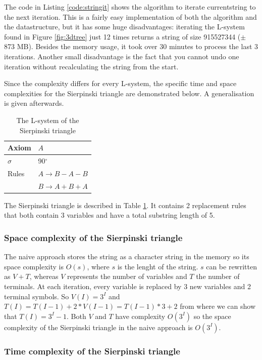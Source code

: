 \documentclass[11pt,a4paper]{article}
\newcommand{\degree}{\ensuremath{^\circ}}
\begin{document}
The code in Listing \ref{code:stringit} shows the algorithm to iterate currentstring to the next iteration. This is a fairly easy implementation of both the algorithm and the datastructure, but it has some huge disadvantages: iterating the L-system found in Figure \ref{fig:3dtree} just 12 times returns a string of size 915527344 ($\pm$ 873 MB). Besides the memory usage, it took over 30 minutes to process the last 3 iterations. Another small disadvantage is the fact that you cannot undo one iteration without recalculating the string from the start.

Since the complexity differs for every L-system, the specific time and space complexities for the Sierpinski triangle are demonstrated below. A generalisation is given afterwards.

\begin{table}
\center
\begin{tabular}{l l}
Axiom & $A$ \\ \hline
$\sigma$ & 90\degree \\ \hline
Rules & $A \rightarrow B-A-B$ \\
      & $B \rightarrow A+B+A$ \\
\end{tabular}
\caption{The L-system of the Sierpinski triangle} \label{tbl:siertri}
\end{table}

The Sierpinski triangle is described in Table \ref{tbl:siertri}. It contains 2 replacement rules that both contain 3 variables and have a total substring length of 5.

\subsubsection{Space complexity of the Sierpinski triangle}

The naive approach stores the string as a character string in the memory so its space complexity is $O(s)$, where $s$ is the lenght of the string. $s$ can be rewritten as $V+T$, whereas $V$ represents the number of variables and $T$ the number of terminals. At each iteration, every variable is replaced by 3 new variables and 2 terminal symbols. So $V(I) = 3^I$ and $T(I) = T(I-1) + 2 * V(I-1) = T(I-1)*3 + 2$ from where we can show that $T(I) = 3^I-1$. Both $V$ and $T$ have complexity $O(3^I)$ so the space complexity of the Sierpinski triangle in the naive approach is $O(3^I)$.

\subsubsection{Time complexity of the Sierpinski triangle}
\end{document}
